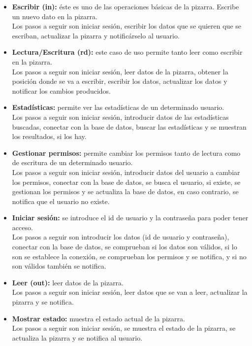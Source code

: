 \begin{itemize}
\item \textbf{Escribir (in):} éste es uno de las operaciones básicas de la pizarra. Escribe un nuevo dato en la pizarra.\\
Los pasos a seguir son iniciar sesión, escribir los datos que se quieren que se escriban, actualizar la pizarra y notificárselo al usuario.

\item \textbf{Lectura/Escritura (rd):} este caso de uso permite tanto leer como escribir en la pizarra.\\
Los pasos a seguir son iniciar sesión, leer datos de la pizarra, obtener la posición donde se va a escribir, escribir los datos, actualizar los datos y notificar los cambios producidos.

\item \textbf{Estadísticas:} permite ver las estadísticas de un determinado usuario.\\
Los pasos a seguir son iniciar sesión, introducir datos de las estadísticas buscadas, conectar con la base de datos, buscar las estadísticas y se muestran los resultados, si los hay.

\item \textbf{Gestionar permisos:} permite cambiar los permisos tanto de lectura como de escritura de un determinado usuario.\\
Los pasos a seguir son iniciar sesión, introducir datos del usuario a cambiar los permisos, conectar con la base de datos, se busca el usuario, si existe, se gestionan los permisos y se actualiza la base de datos, en caso contrario, se notifica que el usuario no existe.

\item  \textbf{Iniciar sesión:} se introduce el id de usuario y la contraseña para poder tener acceso.\\
Los pasos a seguir son introducir los datos (id de usuario y contraseña), conectar con la base de datos, se comprueban si los datos son válidos, si lo son se establece la conexión, se comprueban los permisos y se notifica, y si no son válidos también se notifica.

\item  \textbf{Leer (out):} leer datos de la pizarra.\\
Los pasos a seguir son iniciar sesión, leer datos que se van a leer, actualizar la pizarra y se notifica.

\item \textbf{Mostrar estado:} muestra el estado actual de la pizarra.\\
Los pasos a seguir son iniciar sesión, se muestra el estado de la pizarra, se actualiza la pizarra y se notifica al usuario.
\end{itemize}

